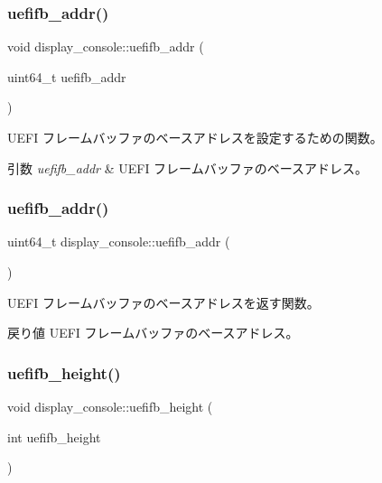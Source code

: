 \subsubsection{\texorpdfstring{uefifb\+\_\+addr()}{uefifb\_addr()}\hspace{0.1cm}{\footnotesize\ttfamily [1/2]}}
{\footnotesize\ttfamily void display\+\_\+console\+::uefifb\+\_\+addr (\begin{DoxyParamCaption}\item[{uint64\+\_\+t}]{uefifb\+\_\+addr }\end{DoxyParamCaption})}

U\+E\+FI フレームバッファのベースアドレスを設定するための関数。 
\begin{DoxyParams}{引数}
{\em uefifb\+\_\+addr} & U\+E\+FI フレームバッファのベースアドレス。 \\
\hline
\end{DoxyParams}
\hypertarget{classdisplay__console_a857a888bad7b9174a3b1310762718433}{}\label{classdisplay__console_a857a888bad7b9174a3b1310762718433} 
\subsubsection{\texorpdfstring{uefifb\+\_\+addr()}{uefifb\_addr()}\hspace{0.1cm}{\footnotesize\ttfamily [2/2]}}
{\footnotesize\ttfamily uint64\+\_\+t display\+\_\+console\+::uefifb\+\_\+addr (\begin{DoxyParamCaption}{ }\end{DoxyParamCaption})}

U\+E\+FI フレームバッファのベースアドレスを返す関数。 \begin{DoxyReturn}{戻り値}
U\+E\+FI フレームバッファのベースアドレス。 
\end{DoxyReturn}
\hypertarget{classdisplay__console_aabd6aa8ac978e0f9e3c6f6b3c9b9d806}{}\label{classdisplay__console_aabd6aa8ac978e0f9e3c6f6b3c9b9d806} 
\subsubsection{\texorpdfstring{uefifb\+\_\+height()}{uefifb\_height()}\hspace{0.1cm}{\footnotesize\ttfamily [1/2]}}
{\footnotesize\ttfamily void display\+\_\+console\+::uefifb\+\_\+height (\begin{DoxyParamCaption}\item[{int}]{uefifb\+\_\+height }\end{DoxyParamCaption})}

